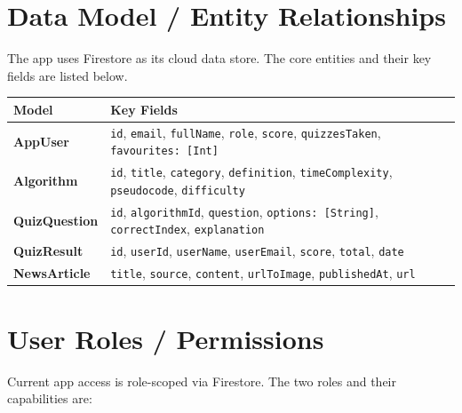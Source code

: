 \documentclass[12pt,a4paper]{article}
\begin{document}
\newpage
\section*{Data Model / Entity Relationships}

The app uses Firestore as its cloud data store. The core entities and their key fields are
listed below.

\begin{center}
\begin{tabularx}{\textwidth}{lX}
\toprule
\textbf{Model} & \textbf{Key Fields} \\
\midrule
\textbf{AppUser}      & \texttt{id}, \texttt{email}, \texttt{fullName}, \texttt{role},
                        \texttt{score}, \texttt{quizzesTaken}, \texttt{favourites: [Int]} \\
\textbf{Algorithm}    & \texttt{id}, \texttt{title}, \texttt{category}, \texttt{definition},
                        \texttt{timeComplexity}, \texttt{pseudocode}, \texttt{difficulty} \\
\textbf{QuizQuestion} & \texttt{id}, \texttt{algorithmId}, \texttt{question},
                        \texttt{options: [String]}, \texttt{correctIndex}, \texttt{explanation} \\
\textbf{QuizResult}   & \texttt{id}, \texttt{userId}, \texttt{userName}, \texttt{userEmail},
                        \texttt{score}, \texttt{total}, \texttt{date} \\
\textbf{NewsArticle}  & \texttt{title}, \texttt{source}, \texttt{content},
                        \texttt{urlToImage}, \texttt{publishedAt}, \texttt{url} \\
\bottomrule
\end{tabularx}
\end{center}

\section*{User Roles / Permissions}

Current app access is role-scoped via Firestore. The two roles and their capabilities are:
\end{document}
